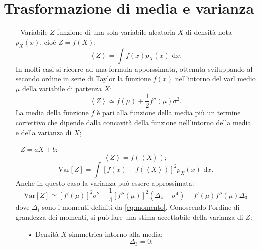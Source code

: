 \section{Trasformazione di media e varianza} %
\label{sec:trasf-media-varianza}
\begin{itemize}
\item[-] Variabile $Z$ funzione di una sola variabile aleatoria $X$ di densità nota $p_X(x)$, cioè $Z=f(X)$:
\begin{equation}
\left< Z \right> =\int { f\left( x \right) { p }_{ X }\left( x \right) \textrm{ d}x } .
\end{equation}
In molti casi si ricorre ad una formula apporssimata, ottenuta sviluppando al secondo ordine in serie di Taylor la funzione $f(x)$ nell'intorno del varl medio $\mu$ della variabile di partenza $X$:
\begin{equation}
\left< Z \right> \simeq f\left( \mu  \right) +\frac { 1 }{ 2 } { f'' }\left( \mu  \right) { \sigma  }^{ 2 }.
\end{equation}
La media della funzione $f$ è pari alla funzione della media più un termine correttivo che dipende dalla concavità della funzione nell'intorno della media e della varianza di $X$;
\item[-] $Z=aX+b$:
\begin{equation}
\left< Z \right> =f\left( \left< X \right>  \right) ;
\end{equation}
\begin{equation}
\textrm{Var}\left[ Z \right] =\int { { \left[ f\left( x \right) -f\left( \left< X \right>  \right)  \right]  }^{ 2 }{ p }_{ X }\left( x \right) \textrm{ d}x } .
\end{equation}
Anche in questo caso la varianza può essere approssimata:
\begin{equation}
\textrm{Var}\left[ Z \right] \simeq { \left[ f'\left( \mu  \right)  \right]  }^{ 2 }{ \sigma  }^{ 2 }+\frac { 1 }{ 4 } { \left[ f''\left( \mu  \right)  \right]  }^{ 2 }\left( { \Delta  }_{ 4 }-{ \sigma  }^{ 4 } \right) +f'\left( \mu  \right) f''\left( \mu  \right) { \Delta  }_{ 3 }
\end{equation}
dove $\Delta_i$ sono i momenti definiti da \ref{eq:momento}. Conoscendo l'ordine di grandezza dei momenti, si può fare una stima accettabile della varianza di $Z$:
\begin{itemize}
\item[•] Densità $X$ simmetrica intorno alla media:
\begin{equation}
{ \Delta  }_{ 3 }=0;

\end{equation}
\end{itemize}
\end{itemize}
